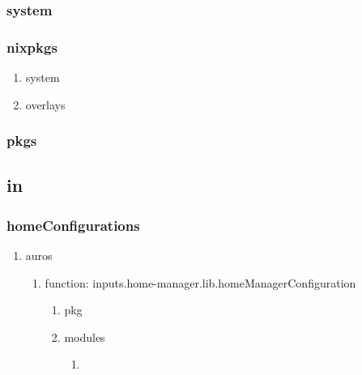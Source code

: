 \documentclass[11pt]{article}
\begin{document}
\subsubsection{system}
\label{sec:org98af988}
\subsubsection{nixpkgs}
\label{sec:org55aa5a7}
\begin{enumerate}
\item system
\label{sec:org983ad6c}
\item overlays
\label{sec:org52f9792}
\end{enumerate}
\subsubsection{pkgs}
\label{sec:orgeb84068}
\subsection{in}
\label{sec:org55e2e21}
\subsubsection{homeConfigurations}
\label{sec:org870f8ff}
\begin{enumerate}
\item auros
\label{sec:org4f7242d}
\begin{enumerate}
\item function:  inputs.home-manager.lib.homeManagerConfiguration
\label{sec:org3d68e39}
\begin{enumerate}
\item pkg
\label{sec:org96f2f97}
\item modules
\label{sec:org42082d3}
\begin{enumerate}
\item{}
\label{sec:orgfbac3d4}
\end{enumerate}
\end{enumerate}
\end{enumerate}
\end{enumerate}
\end{document}
